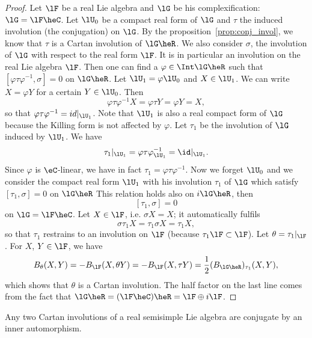 \begin{proof}
Let $\lF$ be a real Lie algebra and $\lG$ be his complexification: $\lG=\lF\heC$. Let $\lU_0$ be a compact real form of $\lG$ and $\tau$ the induced involution (the conjugation) on $\lG$. By the proposition~\ref{prop:conj_invol}, we know that $\tau$ is  a Cartan involution of $\lG\heR$. We also consider $\sigma$, the involution of $\lG$ with respect to the real form $\lF$. It is in particular an involution on the real Lie algebra $\lF$. Then one can find a $\varphi\in\Int\lG\heR$ such that $[\varphi\tau\varphi^{-1},\sigma]=0$ on $\lG\heR$. Let $\lU_1=\varphi\lU_0$ and $X\in\lU_1$. We can write $X=\varphi Y$ for a certain $Y\in\lU_0$. Then
\[
   \varphi\tau\varphi^{-1} X=\varphi\tau Y=\varphi Y=X,
\]
so that $\varphi\tau\varphi^{-1}=id|_{\lU_1}$. Note that $\lU_1$ is also a real compact form of $\lG$ because the Killing form is not affected by $\varphi$. Let $\tau_1$ be the involution of $\lG$ induced by $\lU_1$. We have
\[
   \tau_1|_{\lU_1}=\varphi\tau\varphi^{-1}_{\lU_1}=\id|_{\lU_1}.
\]
Since $\varphi$ is $\eC$-linear, we have in fact $\tau_1=\varphi\tau\varphi^{-1}$. Now we forget $\lU_0$ and we consider the compact real form $\lU_1$ with his involution $\tau_1$ of $\lG$ which satisfy $[\tau_1,\sigma]=0$ on $\lG\heR$ This relation holds also on $i\lG\heR$, then
\[
   [\tau_1,\sigma]=0
\]
on $\lG=\lF\heC$. Let $X\in\lF$, i.e. $\sigma X=X$; it automatically fulfils
\[
  \sigma\tau_1 X=\tau_1\sigma X=\tau_1 X,
\]
so that $\tau_1$ restrains to an involution on $\lF$ (because $\tau_1\lF\subset\lF$). Let $\theta=\tau_1|_{\lF}$. For $X$, $Y\in\lF$, we have
\begin{equation}
B_{\theta}(X,Y)=-B_{\lF}(X, \theta Y)
             =-B_{\lF}(X,\tau Y)
         =\frac{1}{2}(B_{\lG\heR})_{\tau_1}(X,Y),
\end{equation}
which shows that $\theta$ is a Cartan involution. The half factor on the last line comes from the fact that $\lG\heR=(\lF\heC)\heR=\lF\oplus i\lF$.

\end{proof}

\begin{corollary}
Any two Cartan involutions of a real semisimple Lie algebra are conjugate by an inner automorphism. 
\label{cor:Cartan_conj_inner}
\end{corollary}

